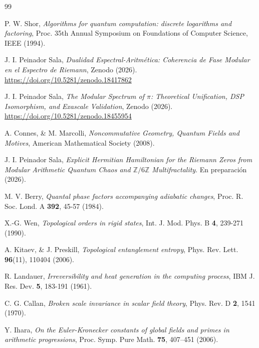 \documentclass[12pt,a4paper]{article}
\theoremstyle{plain}
\theoremstyle{definition}
\theoremstyle{remark}
\begin{document}
\begin{thebibliography}{99}

P. W. Shor, \textit{Algorithms for quantum computation: discrete logarithms and factoring}, Proc. 35th Annual Symposium on Foundations of Computer Science, IEEE (1994).

J. I. Peinador Sala, \textit{Dualidad Espectral-Aritmética: Coherencia de Fase Modular en el Espectro de Riemann}, Zenodo (2026). \url{https://doi.org/10.5281/zenodo.18417862}

J. I. Peinador Sala, \textit{The Modular Spectrum of $\pi$: Theoretical Unification, DSP Isomorphism, and Exascale Validation}, Zenodo (2026). \url{https://doi.org/10.5281/zenodo.18455954}

A. Connes, \& M. Marcolli, \textit{Noncommutative Geometry, Quantum Fields and Motives}, American Mathematical Society (2008).

J. I. Peinador Sala, \textit{Explicit Hermitian Hamiltonian for the Riemann Zeros from Modular Arithmetic Quantum Chaos and $\mathbb{Z}/6\mathbb{Z}$ Multifractality}. En preparación (2026).

M. V. Berry, \textit{Quantal phase factors accompanying adiabatic changes}, Proc. R. Soc. Lond. A \textbf{392}, 45-57 (1984).

X.-G. Wen, \textit{Topological orders in rigid states}, Int. J. Mod. Phys. B \textbf{4}, 239-271 (1990).

A. Kitaev, \& J. Preskill, \textit{Topological entanglement entropy}, Phys. Rev. Lett. \textbf{96}(11), 110404 (2006).

R. Landauer, \textit{Irreversibility and heat generation in the computing process}, IBM J. Res. Dev. \textbf{5}, 183-191 (1961).

C. G. Callan, \textit{Broken scale invariance in scalar field theory}, Phys. Rev. D \textbf{2}, 1541 (1970).

Y. Ihara, \textit{On the Euler-Kronecker constants of global fields and primes in arithmetic progressions}, Proc. Symp. Pure Math. \textbf{75}, 407–451 (2006).


\end{thebibliography}
\end{document}
